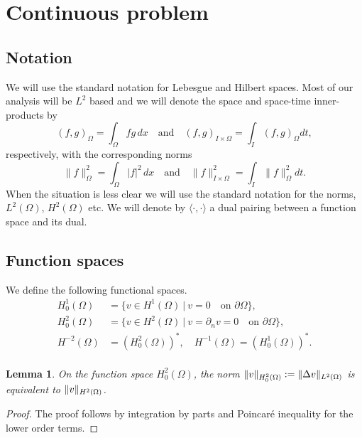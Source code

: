 \documentclass{m2an}
\newcommand{\1}{\mathds{1}}
\newcommand{\Om}{\Omega}
\DeclarePairedDelimiter{\norm}{\lVert}{\rVert}
\newcommand{\Oprod}[1]{\left(#1\right)_{\Omega}}
\newtheorem{lemma}[theorem]{Lemma}
\theoremstyle{definition}
\begin{document}

\section{Continuous problem}\label{sec:continuous}



\subsection{Notation}
We will use the standard notation for Lebesgue and Hilbert spaces. Most of our analysis will be $L^2$ based and we will denote the space and space-time inner-products by 
$$
\Oprod{f,g} =\int_\Omega fg\, dx\quad \text{and}\quad (f,g)_{I\times\Omega}=\int_I(f,g)_\Omega dt,
$$
respectively, with the corresponding norms
$$
\|f\|^2_\Omega =\int_\Omega |f|^2 \, dx\quad \text{and}\quad \|f\|^2_{I\times\Omega}=\int_I\|f\|^2_\Omega dt.
$$
When the situation is less clear we will use the standard notation for the norms, $L^2(\Om)$, $H^2(\Om)$ etc. 
We will denote by $\langle\cdot,\cdot\rangle$ a dual pairing between a function space and its dual. 



\subsection{Function spaces}

We define the following functional spaces.
$$
\begin{aligned}
H^1_0(\Om) &=\{v\in H^1(\Om)\ |\ v=0\quad \text{on $\partial \Om$}\},\\
H^2_0(\Om) &=\{v\in H^2(\Om)\ |\ v=\partial_nv=0\quad \text{on $\partial \Om$}\},\\
H^{-2}(\Om)&=\left(H^2_0(\Om)\right)^*,\quad H^{-1}(\Om)=\left(H^1_0(\Om)\right)^*.\\
\end{aligned}
$$
\begin{lemma}\label{lemm:h2_norm_equivalence}
  On the function space $H^2_0(\Om)$, 
  the norm $\norm{v}_{H^2_0(\Om)} := \norm{\Delta v}_{L^2(\Om)}$ is equivalent to $\norm{v}_{H^2(\Om)}$.
\end{lemma}
\begin{proof}
The proof follows by integration by parts and Poincaré inequality for the lower order terms.
\end{proof}
\end{document}
